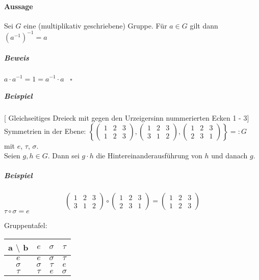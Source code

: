 \documentclass[14pt,a4paper]{article}
\begin{document}
    \paragraph{Aussage}
    Sei $G$ eine (multiplikativ geschriebene) Gruppe. Für $ a \in G$ gilt dann
    $(a^{-1})^{-1} = a$
    \subparagraph{Beweis}
    $a \cdot a^{-1} = 1 = a^{-1} \cdot a\;\;\;\square$

    \subparagraph{Beispiel}
    [ Gleichseitiges Dreieck mit gegen den Urzeigersinn nummerierten Ecken 1 - 3]\\
    Symmetrien in der Ebene: $ \left\{ \begin{pmatrix} 1 & 2 & 3 \\ 1 & 2 &
   	 3 \end{pmatrix}, \begin{pmatrix} 1 & 2 & 3 \\ 3 & 1 & 2 \end{pmatrix}, \begin{pmatrix} 1 & 2 & 3 \\ 2 &
   	 3 & 1 \end{pmatrix} \right\} =: G$ \\
    mit $e$, $\tau$, $\sigma$.\\
    Seien $g,h \in G$. Dann sei $g \cdot h$ die Hintereinanderausführung von $h$
    und danach $g$.

    \subparagraph{Beispiel}
    $$ \begin{pmatrix} 1 & 2 & 3 \\ 3 & 1 & 2 \end{pmatrix} \circ \begin{pmatrix}
      1 & 2 & 3 \\ 2 & 3 & 1 \end{pmatrix} = \begin{pmatrix} 1 & 2 & 3 \\ 1 & 2 &
      3 \end{pmatrix}$$
    $\tau \circ \sigma = e$

    Gruppentafel:\\
    \begin{tabular}{ c | c | c | c }
   	 a $\setminus$ b & $e$ & $\sigma$ & $\tau$ \\ \hline
   	   $e$             & $e$ & $\sigma$ & $\tau$ \\ \hline
   	   $\sigma$        & $\sigma$ & $\tau$ & $e$ \\ \hline
   	   $\tau$          & $\tau$ & $e$ & $\sigma$ \\
      \end{tabular}
\end{document}
